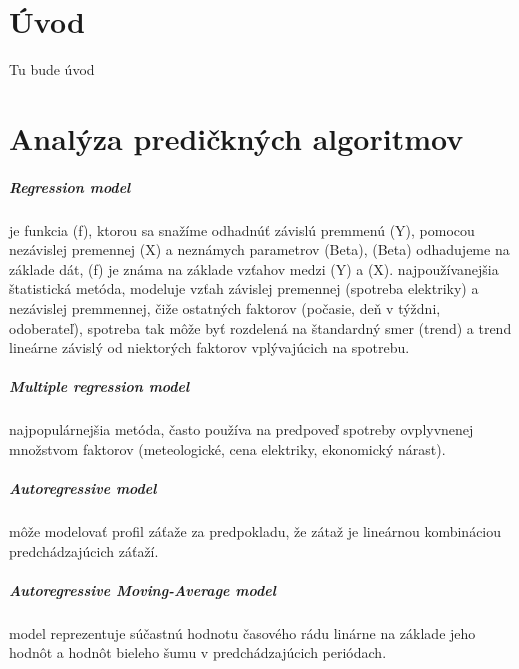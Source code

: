 \documentclass[12pt,oneside,slovak,a4paper]{book}
\begin{document}
\chapter{Úvod}
Tu bude úvod


\chapter{Analýza predičkných algoritmov}

\paragraph{Regression model}
je funkcia (f), ktorou sa snažíme odhadnúť závislú premmenú (Y), pomocou
nezávislej premennej (X) a neznámych parametrov (Beta), (Beta) odhadujeme na
základe dát, (f) je známa na základe vzťahov medzi (Y) a (X)\cite{Grmanova2016}.
najpoužívanejšia štatistická metóda, modeluje vzťah závislej premennej
(spotreba elektriky) a nezávislej premmennej, čiže ostatných faktorov
(počasie, deň v týždni, odoberateľ), spotreba tak môže byť rozdelená na
štandardný smer (trend) a trend lineárne závislý od niektorých faktorov
vplývajúcich na spotrebu\cite{KumarSingh2013}.

\paragraph{Multiple regression model}
najpopulárnejšia metóda, často používa na predpoveď spotreby ovplyvnenej
množstvom faktorov (meteologické, cena elektriky, ekonomický
nárast)\cite{KumarSingh2013}.

\paragraph{Autoregressive model}
môže modelovať profil záťaže za predpokladu, že zátaž je lineárnou kombináciou
predchádzajúcich záťaží\cite{KumarSingh2013}.

\paragraph{Autoregressive Moving-Average model}
model reprezentuje súčastnú hodnotu časového rádu linárne na základe jeho hodnôt
a hodnôt bieleho šumu v predchádzajúcich periódach\cite{KumarSingh2013}.
\end{document}
